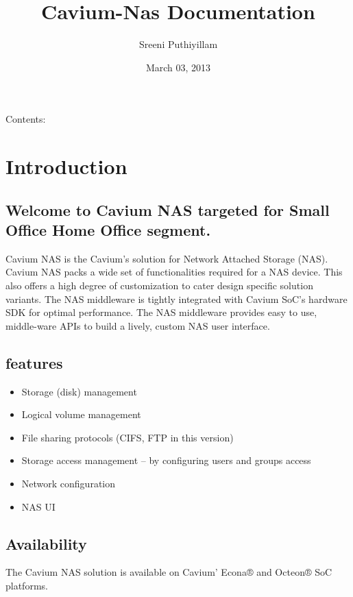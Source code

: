 \documentclass[letterpaper,10pt,english]{sphinxmanual}
\title{Cavium-Nas  Documentation}
\date{March 03, 2013}
\author{Sreeni Puthiyillam}
\begin{document}
\maketitle
\tableofcontents
{}\label{index::doc}


Contents:


\chapter{Introduction}
\label{intro:introduction}\label{intro::doc}\label{intro:welcome-to-cavium-nas-s-documentation}

\section{Welcome to Cavium NAS targeted for Small Office Home Office segment.}
\label{intro:welcome-to-cavium-nas-targeted-for-small-office-home-office-segment}
Cavium NAS is the Cavium’s solution for Network Attached Storage (NAS). Cavium NAS packs a wide set of functionalities required for a NAS device. This also offers a high degree of customization to cater design specific solution variants. The NAS middleware is tightly integrated with Cavium SoC’s hardware SDK for optimal performance. The NAS middleware provides easy to use, middle-ware APIs to build a lively, custom NAS user interface.


\section{features}
\label{intro:features}\begin{itemize}
\item {} 
Storage (disk) management

\item {} 
Logical volume management

\item {} 
File sharing protocols (CIFS, FTP in this version)

\item {} 
Storage access management – by configuring users and groups access

\item {} 
Network configuration

\item {} 
NAS UI

\end{itemize}


\section{Availability}
\label{intro:availability}
The Cavium NAS solution is available on Cavium’ Econa® and Octeon® SoC platforms.
\end{document}
